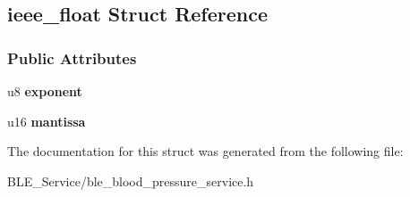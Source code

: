 \hypertarget{structieee__float}{}\subsection{ieee\+\_\+float Struct Reference}
\label{structieee__float}
\subsubsection*{Public Attributes}
\begin{DoxyCompactItemize}
\item 
u8 {\bfseries exponent}\hypertarget{structieee__float_a5cb23f6734ac0e4f9508abf8e6116d20}{}\label{structieee__float_a5cb23f6734ac0e4f9508abf8e6116d20}

\item 
u16 {\bfseries mantissa}\hypertarget{structieee__float_a089e079d014a20c374e52b2adc0a5cb9}{}\label{structieee__float_a089e079d014a20c374e52b2adc0a5cb9}

\end{DoxyCompactItemize}


The documentation for this struct was generated from the following file\+:\begin{DoxyCompactItemize}
\item 
B\+L\+E\+\_\+\+Service/ble\+\_\+blood\+\_\+pressure\+\_\+service.\+h\end{DoxyCompactItemize}
